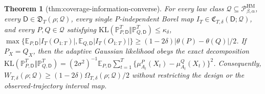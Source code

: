 \documentclass{article}
\newtheorem{theorem}{Theorem}
\begin{document}
\begin{theorem}[thm:coverage-information-converse]\label{thm:coverage-information-converse}
For every law class \(\mathcal Q\subseteq\mathcal P_{\beta,\alpha}^{\mathrm{HM}}\), every \(\mathsf D\in\mathfrak D_T(\rho;\mathcal Q)\), every single \(P\)-independent Borel map \(I_T\in\mathfrak C_{T,\delta}(\mathsf D;\mathcal Q)\), and every \(P,Q\in\mathcal Q\) satisfying \(\mathrm{KL}(\mathbb P_{P,\mathsf D}^{T}\Vert\mathbb P_{Q,\mathsf D}^{T})\le\kappa_\delta\), \(\max\{\mathbb E_{P,\mathsf D}|I_T(O_{1:T})|,\mathbb E_{Q,\mathsf D}|I_T(O_{1:T})|\}\ge(1-2\delta)|\theta(P)-\theta(Q)|/2\). If \(P_X=Q_X\), then the adaptive Gaussian likelihood obeys the exact decomposition \(\mathrm{KL}(\mathbb P_{P,\mathsf D}^{T}\Vert\mathbb P_{Q,\mathsf D}^{T})=(2\sigma^2)^{-1}\mathbb E_{P,\mathsf D}\sum_{t=1}^T\{\mu_{A_t}^P(X_t)-\mu_{A_t}^Q(X_t)\}^2\). Consequently, \(W_{T,\delta}(\rho;\mathcal Q)\ge(1-2\delta)\Omega_{T,\delta}(\rho;\mathcal Q)/2\) without restricting the design or the observed-trajectory interval map.
\end{theorem}
\end{document}
